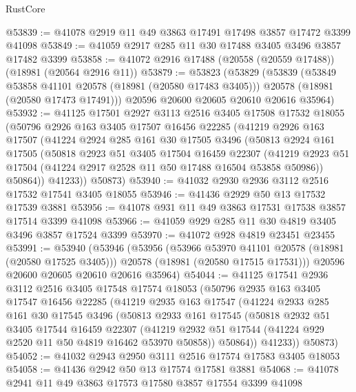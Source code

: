 \begin{lexlean}{RustCore}
\begin{coremodule}
@53839 := @41078 @2919 @11 @49 @3863 @17491 @17498 @3857 @17472 @3399 @41098
@53849 := @41059 @2917 @285 @11 @30 @17488 @3405 @3496 @3857 @17482 @3399
@53858 := @41072 @2916 @17488 (@20558 (@20559 @17488)) (@18981 (@20564 @2916 @11))
@53879 := @53823
    (@53829
      (@53839
        (@53849 @53858 @41101 @20578 (@18981 (@20580 @17483 @3405)))
        @20578
        (@18981 (@20580 @17473 @17491)))
      @20596
      @20600
      @20605
      @20610
      @20616
      @35964)
@53932 := @41125
    @17501
    @2927
    @3113
    @2516
    @3405
    @17508
    @17532
    @18055
    (@50796
      @2926
      @163
      @3405
      @17507
      @16456
      @22285
      (@41219
        @2926
        @163
        @17507
        (@41224
          @2924
          @285
          @161
          @30
          @17505
          @3496
          (@50813
            @2924
            @161
            @17505
            (@50818
              @2923
              @51
              @3405
              @17504
              @16459
              @22307
              (@41219 @2923 @51 @17504 (@41224 @2917 @2528 @11 @50 @17488 @16504 @53858 @50986))
              @50864))
          @41233))
      @50873)
@53940 := @41032 @2930 @2936 @3112 @2516 @17532 @17541 @3405 @18055
@53946 := @41436 @2929 @50 @13 @17532 @17539 @3881
@53956 := @41078 @931 @11 @49 @3863 @17531 @17538 @3857 @17514 @3399 @41098
@53966 := @41059 @929 @285 @11 @30 @4819 @3405 @3496 @3857 @17524 @3399
@53970 := @41072 @928 @4819 @23451 @23455
@53991 := @53940
    (@53946
      (@53956
        (@53966 @53970 @41101 @20578 (@18981 (@20580 @17525 @3405)))
        @20578
        (@18981 (@20580 @17515 @17531)))
      @20596
      @20600
      @20605
      @20610
      @20616
      @35964)
@54044 := @41125
    @17541
    @2936
    @3112
    @2516
    @3405
    @17548
    @17574
    @18053
    (@50796
      @2935
      @163
      @3405
      @17547
      @16456
      @22285
      (@41219
        @2935
        @163
        @17547
        (@41224
          @2933
          @285
          @161
          @30
          @17545
          @3496
          (@50813
            @2933
            @161
            @17545
            (@50818
              @2932
              @51
              @3405
              @17544
              @16459
              @22307
              (@41219 @2932 @51 @17544 (@41224 @929 @2520 @11 @50 @4819 @16462 @53970 @50858))
              @50864))
          @41233))
      @50873)
@54052 := @41032 @2943 @2950 @3111 @2516 @17574 @17583 @3405 @18053
@54058 := @41436 @2942 @50 @13 @17574 @17581 @3881
@54068 := @41078 @2941 @11 @49 @3863 @17573 @17580 @3857 @17554 @3399 @41098

\end{coremodule}
\end{lexlean}
